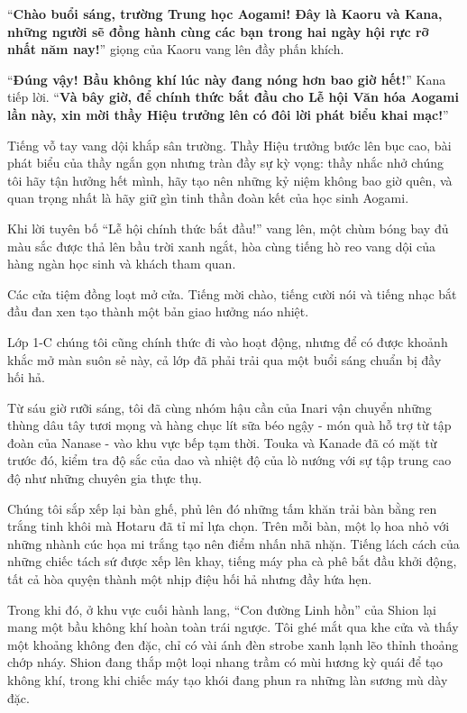 \documentclass[../main.tex]{subfiles}
\begin{document}
``\textbf{Chào buổi sáng, trường Trung học Aogami! Đây là Kaoru và Kana, những người sẽ đồng hành cùng các bạn trong hai ngày hội rực rỡ nhất năm nay!}'' giọng của Kaoru vang lên đầy phấn khích.

``\textbf{Đúng vậy! Bầu không khí lúc này đang nóng hơn bao giờ hết!}'' Kana tiếp lời. ``\textbf{Và bây giờ, để chính thức bắt đầu cho Lễ hội Văn hóa Aogami lần này, xin mời thầy Hiệu trưởng lên có đôi lời phát biểu khai mạc!}''

Tiếng vỗ tay vang dội khắp sân trường. Thầy Hiệu trưởng bước lên bục cao, bài phát biểu của thầy ngắn gọn nhưng tràn đầy sự kỳ vọng: thầy nhắc nhở chúng tôi hãy tận hưởng hết mình, hãy tạo nên những kỷ niệm không bao giờ quên, và quan trọng nhất là hãy giữ gìn tinh thần đoàn kết của học sinh Aogami.

Khi lời tuyên bố ``Lễ hội chính thức bắt đầu!'' vang lên, một chùm bóng bay đủ màu sắc được thả lên bầu trời xanh ngắt, hòa cùng tiếng hò reo vang dội của hàng ngàn học sinh và khách tham quan.

Các cửa tiệm đồng loạt mở cửa. Tiếng mời chào, tiếng cười nói và tiếng nhạc bắt đầu đan xen tạo thành một bản giao hưởng náo nhiệt.

Lớp 1-C chúng tôi cũng chính thức đi vào hoạt động, nhưng để có được khoảnh khắc mở màn suôn sẻ này, cả lớp đã phải trải qua một buổi sáng chuẩn bị đầy hối hả.

Từ sáu giờ rưỡi sáng, tôi đã cùng nhóm hậu cần của Inari vận chuyển những thùng dâu tây tươi mọng và hàng chục lít sữa béo ngậy - món quà hỗ trợ từ tập đoàn của Nanase - vào khu vực bếp tạm thời. Touka và Kanade đã có mặt từ trước đó, kiểm tra độ sắc của dao và nhiệt độ của lò nướng với sự tập trung cao độ như những chuyên gia thực thụ.

Chúng tôi sắp xếp lại bàn ghế, phủ lên đó những tấm khăn trải bàn bằng ren trắng tinh khôi mà Hotaru đã tỉ mỉ lựa chọn. Trên mỗi bàn, một lọ hoa nhỏ với những nhành cúc họa mi trắng tạo nên điểm nhấn nhã nhặn. Tiếng lách cách của những chiếc tách sứ được xếp lên khay, tiếng máy pha cà phê bắt đầu khởi động, tất cả hòa quyện thành một nhịp điệu hối hả nhưng đầy hứa hẹn.

Trong khi đó, ở khu vực cuối hành lang, ``Con đường Linh hồn'' của Shion lại mang một bầu không khí hoàn toàn trái ngược. Tôi ghé mắt qua khe cửa và thấy một khoảng không đen đặc, chỉ có vài ánh đèn strobe xanh lạnh lẽo thỉnh thoảng chớp nháy. Shion đang thắp một loại nhang trầm có mùi hương kỳ quái để tạo không khí, trong khi chiếc máy tạo khói đang phun ra những làn sương mù dày đặc.
\end{document}
